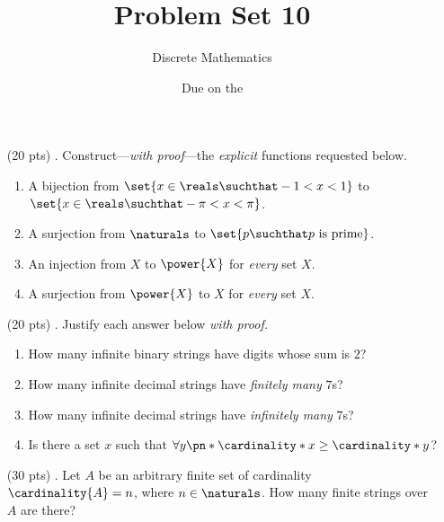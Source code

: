 

\title{Problem Set 10}
\author[Daniel Gonzalez Cedre]{Discrete Mathematics}
\date{Due on the }



\maketitle

\begin{enumerate}
  \item[(20 pts) \quad 1.]
    Construct---\emph{with proof}---the \emph{explicit} functions requested below.
    \begin{enumerate}
      \item
        A bijection from $\set{x \in \reals \suchthat -1 < x < 1}$ to $\set{x \in \reals \suchthat -\pi < x < \pi}$.
      \item
        A surjection from $\naturals$ to $\set{p \suchthat p \text{ is prime}}$.
      \item
        An injection from $X$ to $\power{X}$ for \emph{every} set $X$.
      \item
        A surjection from $\power{X}$ to $X$ for \emph{every} set $X$.
    \end{enumerate}

  \item[(20 pts) \quad 2.]
    Justify each answer below \emph{with proof.}
    \begin{enumerate}
      \item
        How many infinite binary strings have digits whose sum is $2$?
      \item
        How many infinite decimal strings have \emph{finitely many} $7$s?
      \item
        How many infinite decimal strings have \emph{infinitely many} $7$s?
      \item
        Is there a set $x$ such that $\forall y \pn*{\cardinality*{x} \geq \cardinality*{y}}$?
    \end{enumerate}

  \item[(30 pts) \quad 3.]
    Let $A$ be an arbitrary finite set of cardinality $\cardinality{A} = n$, where $n \in \naturals$.
    How many finite strings over $A$ are there?


\end{enumerate}
